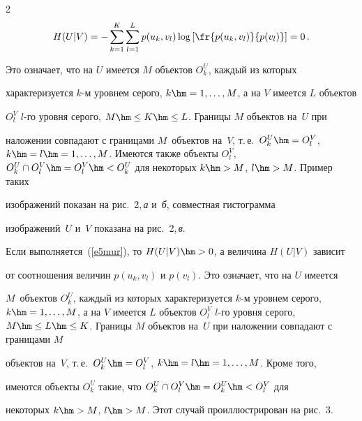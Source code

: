 \begin{multicols}{2}
  \begin{equation*}


  H(U\vert V) = -\sum\limits_{k=1}^K \sum\limits_{l=1}^L p(u_k,v_l)\log \left[ 


\fr{p(u_k,v_l)}{p(v_l)}\right] =0\,.




  \end{equation*}


    Это означает, что на $U$ имеется $M$ объектов $O_k^U$, каждый из которых 


характеризуется $k$-м уровнем серого, $k\hm = 1, \ldots , M$, а на $V$ имеется $L$ объектов 


$O_l^V$ $l$-го уровня серого, $M\hm\leq K\hm\leq L$. Границы $M$ объектов на~$U$ при 


наложении совпадают с границами $M$~объектов на~$V$, т.\,е.\ $O_k^U\hm=O_l^V$, $k\hm 


=l\hm= 1, \ldots , M$. Имеются также объекты $O_l^V$, $O_k^U\cap 


O_l^V\hm=O_l^V\hm<O_k^U$ для некоторых $k\hm>M$, $l\hm>M$. Пример таких 


изображений показан на рис.~2,\,\textit{а} и~\textit{б}, совместная гистограмма 


изображений~$U$ и~$V$ показана на рис.~2,\,\textit{в}.


  





      


  Если выполняется~(\ref{e5mur}), то $H(U\vert V)\hm>0$, а величина $H(U\vert V)$ зависит 


от соотношения величин $p(u_k,v_l)$ и $p(v_l)$. Это означает, что на $U$ имеется 


$M$~объектов $O_k^U$, каждый из которых характеризуется $k$-м уровнем серого, $k\hm = 


1, \ldots , M$, а на $V$ имеется $L$ объектов $O_l^V$ $l$-го уровня серого, $M\hm\leq 


L\hm\leq K$. Границы $M$ объектов на~$U$ при наложении совпадают с границами $M$ 


объектов на~$V$, т.\,е.\ $O_k^U\hm=O_l^V$, $k\hm = l \hm= 1, \ldots , M$. Кроме того, 


имеются объекты $O_k^U$ такие, что $O_k^U\cap O_l^V\hm= O_k^U\hm<O_l^V$ для 


некоторых $k\hm>M$, $l\hm>M$. Этот случай проиллюстрирован на рис.~3.









\end{multicols}
